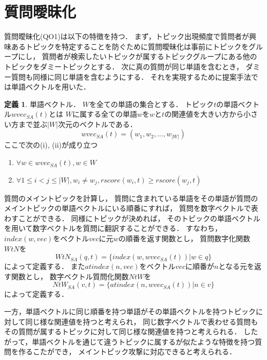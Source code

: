 \documentclass[master]{suribt}
\theoremstyle{definition}
\newtheorem{defi}[thm]{定義}
\begin{document}
 \section{質問曖昧化}\label{s:AAAA}
 質問曖昧化(QO1)は以下の特徴を持つ．
 まず，トピック出現頻度で質問者が興味あるトピックを特定することを防ぐために質問曖昧化は事前にトピックをグループにし，
 質問者が検索したいトピックが属するトピックグループにある他のトピックをダミートピックとする．
 次に真の質問が同じ単語を含むとき， ダミー質問も同様に同じ単語を含むようにする．
 それを実現するために提案手法では単語ベクトルを用いた．
 
 \begin{defi}{単語ベクトル．}
 $W$を全ての単語の集合とする．
 トピック$t$の単語ベクトル$wvec_{SA}(t)$とは
 $W$に属する全ての単語$w$を$w$と$t$の関連値を大きい方から小さい方まで並ぶ$|W|$次元のベクトルである．
 \begin{equation}
  wvec_{SA}(t)  = (w_1,w_2, \dots , w_{|W|})
 \end{equation}
 ここで次の(i), (ii)が成り立つ
 \begin{enumerate}
 \renewcommand{\labelenumi}{(\roman{enumi})}
 \item $\forall w \in wvec_{SA}(t), w \in W$ 
 \item $\forall 1 \leq i < j \leq |W|,w_i \neq w_j,rscore(w_i,t) \geq rscore(w_j,t)$
 \end{enumerate}
 \end{defi}

 質問のメイントピックを計算し，
 質問に含まれている単語をその単語が質問のメイントピックの単語ベクトルにいる順番にすれば，
 質問を数字ベクトルで表わすことができる．
 同様にトピックが決めれば，
 そのトピックの単語ベクトルを用いて数字ベクトルを質問に翻訳することができる．
 すなわち，$index(w,vec)$をベクトル$vec$に元$w$の順番を返す関数とし，
 質問数字化関数$WtN$を
 \begin{equation}
  WtN_{SA}(q,t)  = \{index(w,wvec_{SA}(t))| w \in q\}
 \end{equation}
 によって定義する．
 また$atindex(n,vec)$をベクトル$vec$に順番が$n$となる元を返す関数とし，
 数字ベクトル質問化関数$NtW$を
 \begin{equation}
  NtW_{SA}(v,t)  = \{atindex(n,wvec_{SA}(t))| n \in v\}
 \end{equation}
 によって定義する．

 一方，単語ベクトルに同じ順番を持つ単語がその単語ベクトルを持つトピックに対して同じ様な関連値を持つと考えられ，
 同じ数字ベクトルで表わせる質問もその質問が属するトピックに対して同じ様な関連値を持つと考えられる．
 したがって，単語ベクトルを通じて違うトピックに属するが似たような特徴を持つ質問を作るこたができ，
 メイントピック攻撃に対応できると考えられる．
 
\end{document}
